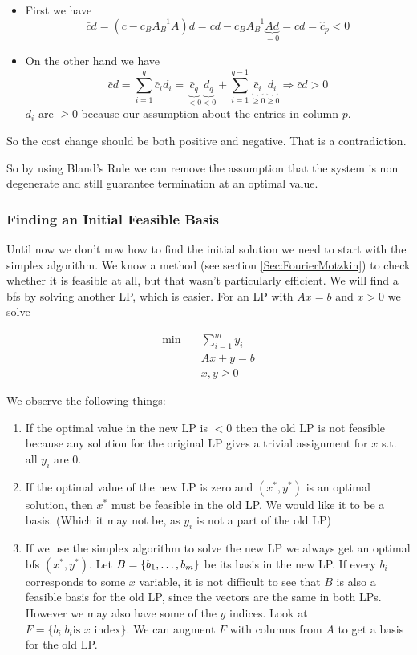 \begin{pr}
\begin{itemize}
\item First we have 
\[\bar cd = (c - c_B A_B^{-1} A) d= cd - c_B A_B^{-1}\underbrace{Ad}_{=0} = cd = \hat c_p<0\]

\item On the other hand we have
\[\bar c d = \sum_{i=1}^{q} \bar c_i d_i = \underbrace{\bar c_q}_{<0}\underbrace{d_q}_{<0} + \sum _{i=1}^{q-1} \underbrace{\bar c_i}_{\geq 0}\underbrace{d_i}_{\geq 0} \Rightarrow \bar c d >0\]
$d_i$ are $\geq 0$ because our assumption about the entries in column $p$. %

\end{itemize}

So the cost change should be both positive and negative. That is a contradiction.
\end{pr}

So by using Bland's Rule we can remove the assumption that the system is non degenerate and still guarantee termination at an optimal value.

\subsubsection*{Finding an Initial Feasible Basis}

Until now we don't now how to find the initial solution we need to start with the simplex algorithm. We know a method (see section \ref{Sec:FourierMotzkin}) to check whether it is feasible at all, but that wasn't particularly efficient. We will find a bfs by solving another LP, which is easier. For an LP with $Ax=b$ and $x>0$ we solve

\begin{align*}
\min \quad & \sum_{i=1}^m y_i\\
&Ax+y=b\\
&x,y\geq 0
\end{align*}

We observe the following things:

\begin{enumerate}
\item If the optimal value in the new LP is $<0$ then the old LP is not feasible because any solution for the original LP gives a trivial assignment for $x$ s.t. all $y_i$ are 0.
\item If the optimal value of the new LP is zero and $(x^*, y^*)$ is an optimal solution, then $x^*$ must be feasible in the old LP. We would like it to be a basis. (Which it may not be, as $y_i$ is not a part of the old LP)
\item If we use the simplex algorithm to solve the new LP we always get an optimal bfs $(x^*,y^*)$. Let $B=\{{b}_1,\ldots,{b}_{m}\}$ be its basis in the new LP. If every $b_i$ corresponds to some $x$ variable, it is not difficult to see that $B$ is also a feasible basis for the old LP, since the vectors are the same in both LPs. However we may also have some of the $y$ indices. Look at $F=\{b_i | b_i \text{is $x$ index}\}$. We can augment $F$ with columns from $A$ to get a basis for the old LP.
\end{enumerate}

